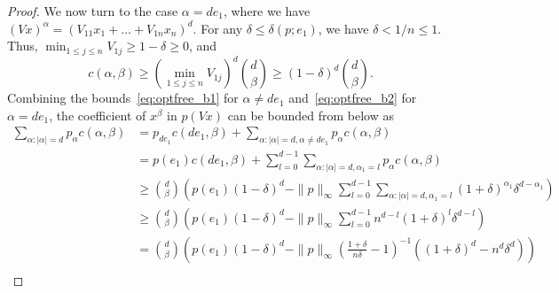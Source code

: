 \documentclass[12pt]{article}
\theoremstyle{remark}
\begin{document}
\begin{proof}
We now turn to the case $\alpha=de_1$, where we have $(Vx)^{\alpha}=(V_{11}x_1+\ldots+V_{1n}x_n)^d$. For any $\delta\le \delta(p;e_1)$, we have $\delta < 1/n\le 1$. Thus, $\min_{1\le j\le n} V_{1j}\ge1-\delta\ge 0$, and
\begin{equation}\label{eq:optfree_b2}
c(\alpha,\beta)\ge \left(\min_{1\le j\le n}V_{1j}\right)^{d}\binom{d}{\beta}\ge (1-\delta)^d\binom{d}{\beta}.
\end{equation}
Combining the bounds~\eqref{eq:optfree_b1} for $\alpha\neq de_1$ and~\eqref{eq:optfree_b2} for $\alpha=de_1$, the coefficient of $x^{\beta}$ in $p(Vx)$ can be bounded from below as
\[\begin{aligned}
\sum_{\alpha:|\alpha|=d}p_{\alpha}c(\alpha,\beta)&=p_{de_1}c(de_1,\beta)+\sum_{\alpha:|\alpha|=d,
\alpha \neq de_1}p_{\alpha}c(\alpha,\beta)\\
&=p(e_1)c(de_1,\beta)+\sum_{l=0}^{d-1}\sum_{\alpha:|\alpha|=d,\alpha_1=l}p_{\alpha}c(\alpha,\beta)\\
&\ge \binom{d}{\beta}\left(p(e_1)(1-\delta)^d-\|p\|_{\infty}\sum_{l=0}^{d-1}\sum_{\alpha:|\alpha|=d,\alpha_1=l}(1+\delta)^{\alpha_1}\delta^{d-\alpha_1}\right)\\
&\ge\binom{d}{\beta}\left(p(e_1)(1-\delta)^d-\|p\|_{\infty}\sum_{l=0}^{d-1}n^{d-l}(1+\delta)^{l}\delta^{d-l}\right)\\
&=\binom{d}{\beta}\left(p(e_1)(1-\delta)^d-\|p\|_{\infty}\left(\frac{1+\delta}{n\delta}-1\right)^{-1}\left((1+\delta)^d-n^{d}\delta^d\right)\right)\\

\end{aligned}\]
\end{proof}
\end{document}
